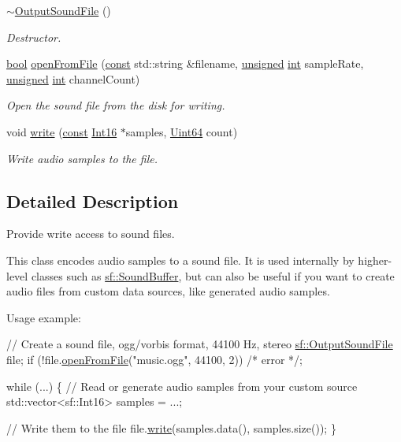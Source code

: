 \begin{DoxyCompactItemize}
\hyperlink{classsf_1_1_output_sound_file_a1492adbfef1f391d720afb56f068182e}{$\sim$\-Output\-Sound\-File} ()
\begin{DoxyCompactList}\small\item\em Destructor. \end{DoxyCompactList}\item 
\hyperlink{term__entry_8h_a002004ba5d663f149f6c38064926abac}{bool} \hyperlink{classsf_1_1_output_sound_file_ae5e55f01c53c1422c44eaed2eed67fce}{open\-From\-File} (\hyperlink{term__entry_8h_a57bd63ce7f9a353488880e3de6692d5a}{const} std\-::string \&filename, \hyperlink{curses_8priv_8h_aca40206900cfc164654362fa8d4ad1e6}{unsigned} \hyperlink{term__entry_8h_ad65b480f8c8270356b45a9890f6499ae}{int} sample\-Rate, \hyperlink{curses_8priv_8h_aca40206900cfc164654362fa8d4ad1e6}{unsigned} \hyperlink{term__entry_8h_ad65b480f8c8270356b45a9890f6499ae}{int} channel\-Count)
\begin{DoxyCompactList}\small\item\em Open the sound file from the disk for writing. \end{DoxyCompactList}\item 
void \hyperlink{classsf_1_1_output_sound_file_adfcf525fced71121f336fa89faac3d67}{write} (\hyperlink{term__entry_8h_a57bd63ce7f9a353488880e3de6692d5a}{const} \hyperlink{namespacesf_a3c8e10435e2a310a7741755e66b5c94e}{Int16} $\ast$samples, \hyperlink{namespacesf_add9ac83466d96b9f50a009b9f4064266}{Uint64} count)
\begin{DoxyCompactList}\small\item\em Write audio samples to the file. \end{DoxyCompactList}\end{DoxyCompactItemize}


\subsection{Detailed Description}
Provide write access to sound files. 

This class encodes audio samples to a sound file. It is used internally by higher-\/level classes such as \hyperlink{classsf_1_1_sound_buffer}{sf\-::\-Sound\-Buffer}, but can also be useful if you want to create audio files from custom data sources, like generated audio samples.

Usage example\-: 
\begin{DoxyCode}
\textcolor{comment}{// Create a sound file, ogg/vorbis format, 44100 Hz, stereo}
\hyperlink{classsf_1_1_output_sound_file}{sf::OutputSoundFile} file;
\textcolor{keywordflow}{if} (!file.\hyperlink{classsf_1_1_output_sound_file_ae5e55f01c53c1422c44eaed2eed67fce}{openFromFile}(\textcolor{stringliteral}{"music.ogg"}, 44100, 2))
    \textcolor{comment}{/* error */};

\textcolor{keywordflow}{while} (...)
\{
    \textcolor{comment}{// Read or generate audio samples from your custom source}
    std::vector<sf::Int16> samples = ...;

    \textcolor{comment}{// Write them to the file}
    file.\hyperlink{classsf_1_1_output_sound_file_adfcf525fced71121f336fa89faac3d67}{write}(samples.data(), samples.size());
\}
\end{DoxyCode}


